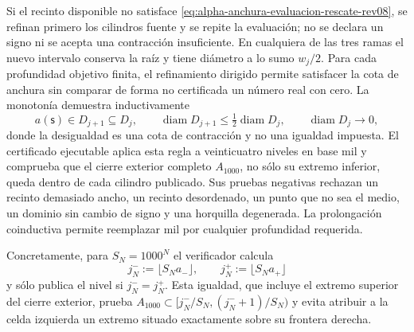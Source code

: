 Si el recinto disponible no satisface
\eqref{eq:alpha-anchura-evaluacion-rescate-rev08}, se refinan primero los
cilindros fuente y se repite la evaluación; no se declara un signo ni se
acepta una contracción insuficiente. En cualquiera de las tres ramas el nuevo
intervalo conserva la raíz y tiene diámetro a lo sumo \(w_j/2\). Para cada
profundidad objetivo finita, el refinamiento dirigido permite satisfacer la
cota de anchura sin comparar de forma no certificada un número real con cero.
La monotonía demuestra inductivamente
\begin{equation}
 a(\mathsf s)\in D_{j+1}\subseteq D_j,\qquad
 \operatorname{diam}D_{j+1}\leq
 \tfrac12\operatorname{diam}D_j,
 \qquad \operatorname{diam}D_j\longrightarrow0,
 \label{eq:alpha-biseccion-racional}
\end{equation}
donde la desigualdad es una cota de contracción y no una igualdad impuesta.
El certificado ejecutable aplica
esta regla a veinticuatro niveles en base mil y comprueba que el cierre
exterior completo \(A_{1000}\), no sólo su extremo inferior, queda dentro de
cada cilindro publicado. Sus pruebas negativas rechazan un recinto demasiado
ancho, un recinto desordenado, un punto que no sea el medio, un dominio sin
cambio de signo y una horquilla degenerada. La prolongación coinductiva permite
reemplazar mil por cualquier profundidad requerida.

Concretamente, para \(S_N=1000^N\) el verificador calcula
\begin{equation}
 j_N^-:=\lfloor S_Na_-\rfloor,
 \qquad j_N^+:=\lfloor S_Na_+\rfloor
 \label{eq:alpha-indices-cilindro-dirigidos-rev08}
\end{equation}
y sólo publica el nivel si \(j_N^-=j_N^+\). Esta igualdad, que incluye el
extremo superior del cierre exterior, prueba
\(A_{1000}\subset[j_N^-/S_N,(j_N^-+1)/S_N)\) y evita atribuir a la celda
izquierda un extremo situado exactamente sobre su frontera derecha.

